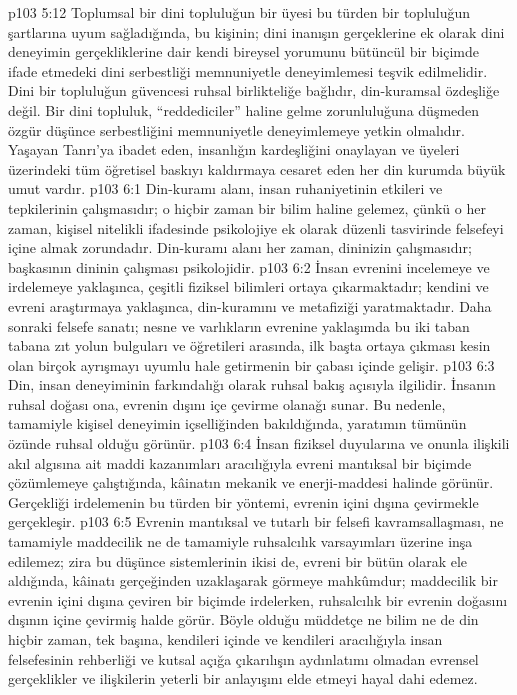 \vs p103 5:12 Toplumsal bir dini topluluğun bir üyesi bu türden bir topluluğun şartlarına uyum sağladığında, bu kişinin; dini inanışın gerçeklerine ek olarak dini deneyimin gerçekliklerine dair kendi bireysel yorumunu bütüncül bir biçimde ifade etmedeki dini serbestliği memnuniyetle deneyimlemesi teşvik edilmelidir. Dini bir topluluğun güvencesi ruhsal birlikteliğe bağlıdır, din\hyp{}kuramsal özdeşliğe değil. Bir dini topluluk, “reddediciler” haline gelme zorunluluğuna düşmeden özgür düşünce serbestliğini memnuniyetle deneyimlemeye yetkin olmalıdır. Yaşayan Tanrı’ya ibadet eden, insanlığın kardeşliğini onaylayan ve üyeleri üzerindeki tüm öğretisel baskıyı kaldırmaya cesaret eden her din kurumda büyük umut vardır.
\vs p103 6:1 Din\hyp{}kuramı alanı, insan ruhaniyetinin etkileri ve tepkilerinin çalışmasıdır; o hiçbir zaman bir bilim haline gelemez, çünkü o her zaman, kişisel nitelikli ifadesinde psikolojiye ek olarak düzenli tasvirinde felsefeyi içine almak zorundadır. Din\hyp{}kuramı alanı her zaman,  dininizin çalışmasıdır; başkasının dininin çalışması psikolojidir.
\vs p103 6:2 İnsan evrenini incelemeye ve irdelemeye  yaklaşınca, çeşitli fiziksel bilimleri ortaya çıkarmaktadır; kendini ve evreni  araştırmaya yaklaşınca, din\hyp{}kuramını ve metafiziği yaratmaktadır. Daha sonraki felsefe sanatı; nesne ve varlıkların evrenine yaklaşımda bu iki taban tabana zıt yolun bulguları ve öğretileri arasında, ilk başta ortaya çıkması kesin olan birçok ayrışmayı uyumlu hale getirmenin bir çabası içinde gelişir.
\vs p103 6:3 Din, insan deneyiminin  farkındalığı olarak ruhsal bakış açısıyla ilgilidir. İnsanın ruhsal doğası ona, evrenin dışını içe çevirme olanağı sunar. Bu nedenle, tamamiyle kişisel deneyimin içselliğinden bakıldığında, yaratımın tümünün özünde ruhsal olduğu görünür.
\vs p103 6:4 İnsan fiziksel duyularına ve onunla ilişkili akıl algısına ait maddi kazanımları aracılığıyla evreni mantıksal bir biçimde çözümlemeye çalıştığında, kâinatın mekanik ve enerji\hyp{}maddesi halinde görünür. Gerçekliği irdelemenin bu türden bir yöntemi, evrenin içini dışına çevirmekle gerçekleşir.
\vs p103 6:5 Evrenin mantıksal ve tutarlı bir felsefi kavramsallaşması, ne tamamiyle maddecilik ne de tamamiyle ruhsalcılık varsayımları üzerine inşa edilemez; zira bu düşünce sistemlerinin ikisi de, evreni bir bütün olarak ele aldığında, kâinatı gerçeğinden uzaklaşarak görmeye mahkûmdur; maddecilik bir evrenin içini dışına çeviren bir biçimde irdelerken, ruhsalcılık bir evrenin doğasını dışının içine çevirmiş halde görür. Böyle olduğu müddetçe ne bilim ne de din hiçbir zaman, tek başına, kendileri içinde ve kendileri aracılığıyla insan felsefesinin rehberliği ve kutsal açığa çıkarılışın aydınlatımı olmadan evrensel gerçeklikler ve ilişkilerin yeterli bir anlayışını elde etmeyi hayal dahi edemez.
